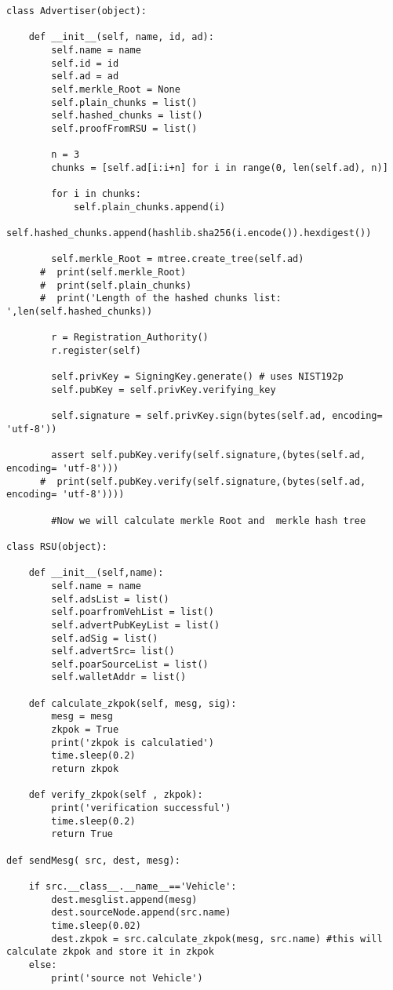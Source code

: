\begin{linenumbers}
\begin{lstlisting}
class Advertiser(object):

    def __init__(self, name, id, ad):
        self.name = name
        self.id = id
        self.ad = ad
        self.merkle_Root = None
        self.plain_chunks = list()
        self.hashed_chunks = list()
        self.proofFromRSU = list()

        n = 3
        chunks = [self.ad[i:i+n] for i in range(0, len(self.ad), n)]
        
        for i in chunks:
            self.plain_chunks.append(i)
            self.hashed_chunks.append(hashlib.sha256(i.encode()).hexdigest())
        
        self.merkle_Root = mtree.create_tree(self.ad)
      #  print(self.merkle_Root)
      #  print(self.plain_chunks)
      #  print('Length of the hashed chunks list: ',len(self.hashed_chunks))

        r = Registration_Authority()
        r.register(self)

        self.privKey = SigningKey.generate() # uses NIST192p
        self.pubKey = self.privKey.verifying_key
        
        self.signature = self.privKey.sign(bytes(self.ad, encoding= 'utf-8'))
        
        assert self.pubKey.verify(self.signature,(bytes(self.ad, encoding= 'utf-8')))
      #  print(self.pubKey.verify(self.signature,(bytes(self.ad, encoding= 'utf-8'))))

        #Now we will calculate merkle Root and  merkle hash tree

class RSU(object):

    def __init__(self,name):
        self.name = name
        self.adsList = list()
        self.poarfromVehList = list()
        self.advertPubKeyList = list()
        self.adSig = list()
        self.advertSrc= list()
        self.poarSourceList = list()
        self.walletAddr = list()

    def calculate_zkpok(self, mesg, sig):
        mesg = mesg
        zkpok = True
        print('zkpok is calculatied')
        time.sleep(0.2)
        return zkpok

    def verify_zkpok(self , zkpok): 
        print('verification successful')
        time.sleep(0.2)
        return True

def sendMesg( src, dest, mesg):

    if src.__class__.__name__=='Vehicle': 
        dest.mesglist.append(mesg)
        dest.sourceNode.append(src.name) 
        time.sleep(0.02)
        dest.zkpok = src.calculate_zkpok(mesg, src.name) #this will calculate zkpok and store it in zkpok
    else:
        print('source not Vehicle')


\end{lstlisting}
\end{linenumbers}
